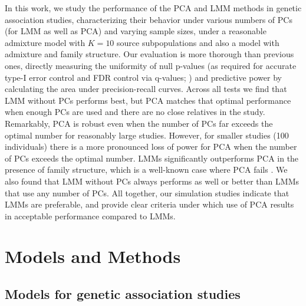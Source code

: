 \documentclass[11pt]{article}
\begin{document}
In this work, we study the performance of the PCA and LMM methods in genetic association studies, characterizing their behavior under various numbers of PCs (for LMM as well as PCA) and varying sample sizes, under a reasonable admixture model with $K = 10$ source subpopulations and also a model with admixture and family structure.
Our evaluation is more thorough than previous ones, directly measuring the uniformity of null p-values (as required for accurate type-I error control and FDR control via q-values; \cite{storey_positive_2003, storey_statistical_2003}) and predictive power by calculating the area under precision-recall curves.
Across all tests we find that LMM without PCs performs best, but PCA matches that optimal performance when enough PCs are used and there are no close relatives in the study.
Remarkably, PCA is robust even when the number of PCs far exceeds the optimal number for reasonably large studies.
However, for smaller studies (100 individuals) there is a more pronounced loss of power for PCA when the number of PCs exceeds the optimal number.
LMMs significantly outperforms PCA in the presence of family structure, which is a well-known case where PCA fails \citep{patterson_population_2006, price_new_2010}.
We also found that LMM without PCs always performs as well or better than LMMs that use any number of PCs.
All together, our simulation studies indicate that LMMs are preferable, and provide clear criteria under which use of PCA results in acceptable performance compared to LMMs.


\section{Models and Methods}

\subsection{Models for genetic association studies}
\end{document}
